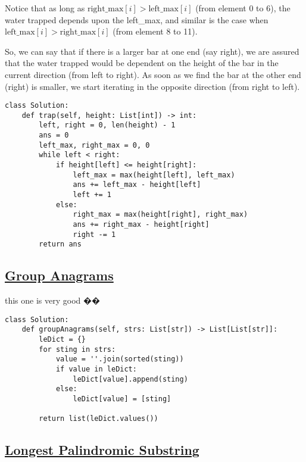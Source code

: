 \documentclass{article}
\begin{document}
Notice that as long as \( \text{right\_max}[i] > \text{left\_max}[i] \) (from element 0 to 6), the water trapped depends upon the left\_max, and similar is the case when \( \text{left\_max}[i] > \text{right\_max}[i] \) (from element 8 to 11).\newline

So, we can say that if there is a larger bar at one end (say right), we are assured that the water trapped would be dependent on the height of the bar in the current direction (from left to right). As soon as we find the bar at the other end (right) is smaller, we start iterating in the opposite direction (from right to left).

\begin{lstlisting}
class Solution:
    def trap(self, height: List[int]) -> int:
        left, right = 0, len(height) - 1
        ans = 0
        left_max, right_max = 0, 0
        while left < right:
            if height[left] <= height[right]:
                left_max = max(height[left], left_max)
                ans += left_max - height[left]
                left += 1
            else:
                right_max = max(height[right], right_max)
                ans += right_max - height[right]
                right -= 1
        return ans
\end{lstlisting}

\subsection{\href{https://leetcode.com/problems/group-anagrams/?envType=company&envId=amazon&favoriteSlug=amazon-thirty-days}{Group Anagrams}}


this one is very good ��

\begin{lstlisting}
class Solution:
    def groupAnagrams(self, strs: List[str]) -> List[List[str]]:
        leDict = {}
        for sting in strs:
            value = ''.join(sorted(sting))
            if value in leDict:
                leDict[value].append(sting)
            else:
                leDict[value] = [sting]
        
        return list(leDict.values())

\end{lstlisting}

\subsection{\href{https://leetcode.com/problems/longest-palindromic-substring/description/?envType=company&envId=amazon&favoriteSlug=amazon-all}{Longest Palindromic Substring}}
\end{document}
